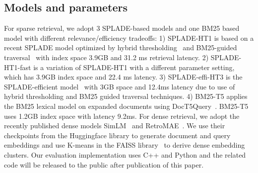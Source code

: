 \subsection{Models and parameters}
For sparse retrieval, we adopt 3 SPLADE-based  models and one BM25 based model with different relevance/efficiency  tradeoffs:
1) SPLADE-HT1 is based on   a recent SPLADE model optimized by  hybrid thresholding~\cite{2023SIGIR-Qiao}
and BM25-guided traversal~\cite{mallia2022faster,qiao2023optimizing} with index space 3.9GB
and 31.2 ms retrieval latency. 2) SPLADE-HT1-fast is a variation of SPLADE-HT1 with a different parameter setting, which has 
3.9GB index space and 22.4 ms latency. 
3) SPLADE-effi-HT3 is the SPLADE-efficient model~\cite{Lassance2022SPLADE-efficient} with 3GB space
and  12.4ms latency due to use of hybrid thresholding and BM25 guided traversal techniques. 
4) BM25-T5 applies  the BM25 lexical model on expanded documents using DocT5Query~\cite{Cheriton2019doct5query}. 
BM25-T5 uses 1.2GB index space with latency 9.2ms. 
For dense retrieval, we adopt the recently published   dense models
SimLM~\cite{Wang2022SimLM} and RetroMAE~\cite{Liu2022RetroMAE}. 
We use their   checkpoints from the Huggingface library to generate document and query embeddings 
and  use  K-means in the FAISS library~\cite{johnson2019billion} to derive dense embedding clusters.
Our evaluation implementation uses C++ and Python and the
related code will be released to the public after publication of this paper. 

